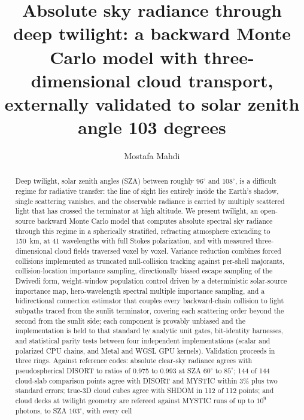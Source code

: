 \documentclass[preprint,12pt]{elsarticle}
\begin{document}
\begin{frontmatter}

\title{Absolute sky radiance through deep twilight: a backward Monte
Carlo model with three-dimensional cloud transport, externally validated
to solar zenith angle 103 degrees}

\author[ku]{Mostafa Mahdi}

\begin{abstract}
Deep twilight, solar zenith angles (SZA) between roughly $96^\circ$ and
$108^\circ$, is a difficult regime for radiative transfer: the line of
sight lies entirely inside the Earth's shadow, single scattering vanishes,
and the observable radiance is carried by multiply scattered light that has
crossed the terminator at high altitude. We present \textsf{twilight}, an
open-source backward Monte Carlo model that computes absolute spectral sky
radiance through this regime in a spherically stratified, refracting
atmosphere extending to 150~km, at 41 wavelengths with full Stokes
polarization, and with measured three-dimensional cloud fields traversed
voxel by voxel. Variance reduction combines forced collisions implemented
as truncated null-collision tracking against per-shell majorants,
collision-location importance sampling, directionally biased escape
sampling of the Dwivedi form, weight-window population control driven by a
deterministic solar-source importance map, hero-wavelength spectral
multiple importance sampling, and a bidirectional connection estimator
that couples every backward-chain collision to light subpaths traced from
the sunlit terminator, covering each scattering order beyond the second
from the sunlit side; each component is provably unbiased and the
implementation is held to that standard by analytic unit gates,
bit-identity harnesses, and statistical parity tests between four
independent implementations (scalar and polarized CPU chains, and Metal and
WGSL GPU kernels). Validation proceeds in three rings. Against reference
codes: absolute clear-sky radiance agrees with pseudospherical DISORT to
ratios of 0.975 to 0.993 at SZA $60^\circ$ to $85^\circ$;
144 of 144 cloud-slab comparison points agree with DISORT and MYSTIC within
3\% plus two standard errors; true-3D cloud cubes agree with SHDOM in 112
of 112 points; and cloud decks at twilight geometry are refereed against
MYSTIC runs of up to $10^9$ photons, to SZA $103^\circ$, with every cell

\end{abstract}
\end{frontmatter}
\end{document}
